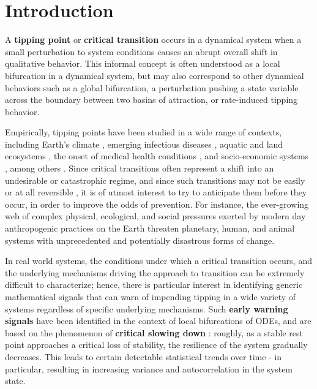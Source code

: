 \section{Introduction}
\label{sec:intro}

A \textbf{tipping point} or \textbf{critical transition} occurs in a dynamical system when a small perturbation to system conditions causes an abrupt overall shift in qualitative behavior. This informal concept is often understood as a local bifurcation in a dynamical system, but may also correspond to other dynamical behaviors such as a global bifurcation, a perturbation pushing a state variable across the boundary between two basins of attraction, or rate-induced tipping behavior. 

Empirically, tipping points have been studied in a wide range of contexts, including Earth's climate \cite{lentonTippingElementsEarth2008, dakosSlowingEarlyWarning2008a}, emerging infectious diseases \cite{brettDynamicalFootprintsEnable2020}, aquatic and land ecosystems \cite{schefferCatastrophicShiftsEcosystems2001a, carpenterRisingVarianceLeading2006}, the onset of medical health conditions \cite{mcsharryPredictionEpilepticSeizures2003, venegasSelforganizedPatchinessAsthma2005}, and socio-economic systems \cite{ginkelClimateChangeInduced2020}, among others \cite{georgeEarlyWarningSignals2021, schefferEarlywarningSignalsCritical2009a}. Since critical transitions often represent a shift into an undesirable or catastrophic regime, and since such transitions may not be easily or at all reversible \cite{albrichClimateChangeCauses2020, chenImperfectVaccineHysteresis2019, lucariniThermodynamicAnalysisSnowball2010}, it is of utmost interest to try to anticipate them before they occur, in order to improve the odds of prevention. For instance, the ever-growing web of complex physical, ecological, and social pressures exerted by modern day anthropogenic practices on the Earth threaten planetary, human, and animal systems with unprecedented and potentially disastrous forms of change. 

In real world systems, the conditions under which a critical transition occurs, and the underlying mechanisms driving the approach to transition can be extremely difficult to characterize; hence, there is particular interest in identifying generic mathematical signals that can warn of impending tipping in a wide variety of systems regardless of specific underlying mechanisms. Such \textbf{early warning signals} have been identified in the context of local bifurcations of ODEs, and are based on the phenomenon of \textbf{critical slowing down} \cite{schefferEarlywarningSignalsCritical2009a}: roughly, as a stable rest point approaches a critical loss of stability, the resilience of the system gradually decreases. This leads to certain detectable statistical trends over time - in particular, resulting in increasing variance and autocorrelation in the system state. 




